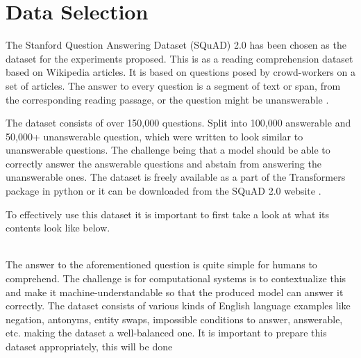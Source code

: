 \documentclass[a4paper,12pt]{report}
\begin{document}
    \section{Data Selection}\label{c31}

    	The Stanford Question Answering Dataset (SQuAD) 2.0 has been chosen as the dataset for the experiments proposed. This is as a reading comprehension dataset based on Wikipedia articles. It is based on questions posed by crowd-workers on a set of articles. The answer to every question is a segment of text or span, from the corresponding reading passage, or the question might be unanswerable \citep{dataset}.

    	The dataset consists of over 150,000 questions. Split into 100,000 answerable and 50,000+ unanswerable question, which were written to look similar to unanswerable questions. The challenge being that a model should be able to correctly answer the answerable questions and abstain from answering the unanswerable ones.
	    The dataset is freely available as a part of the Transformers package in python or it can be downloaded from the SQuAD 2.0 website \citep{squad}.

	    To effectively use this dataset it is important to first take a look at what its contents look like below.\\ \\
	    \noindent{}
	    \newline
	    \newline

	    The answer to the aforementioned question is quite simple for humans to comprehend. The challenge is for computational systems is to contextualize this and make it machine-understandable so that the produced model can answer it correctly.
	    The dataset consists of various kinds of English language examples like negation, antonyms, entity swaps, impossible conditions to answer, answerable, etc. making the dataset a well-balanced one.
	    It is important to prepare this dataset appropriately, this will be done
\end{document}
